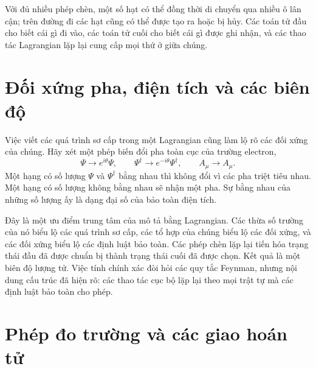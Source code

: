 Với đủ nhiều phép chèn, một số hạt có thể đồng thời di chuyển qua nhiều ô lân cận; trên đường đi các hạt cũng có thể được tạo ra hoặc bị hủy. Các toán tử đầu cho biết cái gì đi vào, các toán tử cuối cho biết cái gì được ghi nhận, và các thao tác Lagrangian lặp lại cung cấp mọi thứ ở giữa chúng.

\begin{classroomqa}
\end{classroomqa}

\section{Đối xứng pha, điện tích và các biên độ}

Việc viết các quá trình sơ cấp trong một Lagrangian cũng làm lộ rõ các đối xứng của chúng. Hãy xét một phép biến đổi pha toàn cục của trường electron,
\begin{equation}
\Psi\longrightarrow e^{i\theta}\Psi,
\qquad
\Psi^\dagger\longrightarrow e^{-i\theta}\Psi^\dagger,
\qquad
A_\mu\longrightarrow A_\mu.
\end{equation}
Một hạng có số lượng \(\Psi\) và \(\Psi^\dagger\) bằng nhau thì không đổi vì các pha triệt tiêu nhau. Một hạng có số lượng không bằng nhau sẽ nhận một pha. Sự bằng nhau của những số lượng ấy là dạng đại số của bảo toàn điện tích.

Đây là một ưu điểm trung tâm của mô tả bằng Lagrangian. Các thừa số trường của nó biểu lộ các quá trình sơ cấp, các tổ hợp của chúng biểu lộ các đối xứng, và các đối xứng biểu lộ các định luật bảo toàn. Các phép chèn lặp lại tiến hóa trạng thái đầu đã được chuẩn bị thành trạng thái cuối đã được chọn. Kết quả là một biên độ lượng tử. Việc tính chính xác đòi hỏi các quy tắc Feynman, nhưng nội dung cấu trúc đã hiện rõ: các thao tác cục bộ lặp lại theo mọi trật tự mà các định luật bảo toàn cho phép.

\section{Phép đo trường và các giao hoán tử}

